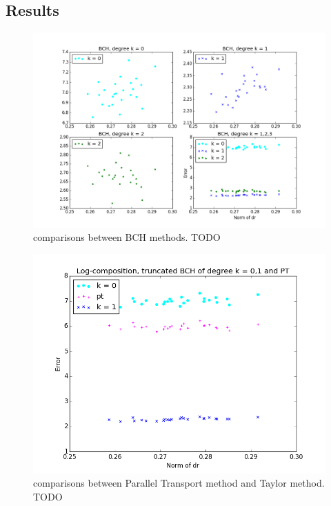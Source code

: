 \subsection{Results}









\begin{figure}[!ht]
	\hspace{-3cm}
	\includegraphics[scale=0.65]{figures/se2_four_BCH.png}
	\caption{comparisons between BCH methods. TODO}
	\label{fig:se2_four_BCH}
\end{figure}

\begin{figure}[!ht]
	\hspace{-2cm}
	\includegraphics[scale=0.6]{figures/se2_pt_taylor.png}
	\caption{comparisons between Parallel Transport method and Taylor method. TODO}
	\label{fig:se2_pt_taylor}
\end{figure}


